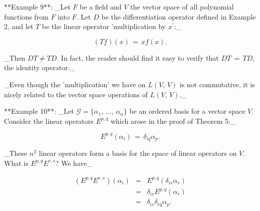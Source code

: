 

**Example 9**: _Let \(F\) be a field and \(V\) the vector space of all polynomial functions from \(F\) into \(F\). Let \(D\) be the differentiation operator defined in Example 2, and let \(T\) be the linear operator 'multiplication by \(x^{\prime}\):_

\[(Tf)(x)\,=\,xf(x).\]

_Then \(DT\neq TD\). In fact, the reader should find it easy to verify that \(DT\,=\,TD\), the identity operator._

_Even though the 'multiplication' we have on \(L(V,\,V)\) is not commutative, it is nicely related to the vector space operations of \(L(V,\,V)\)._

**Example 10**: _Let \(\mathcal{G}=\{\alpha_{1},\,\ldots,\,\alpha_{n}\}\) be an ordered basis for a vector space \(V\). Consider the linear operators \(E^{p,q}\) which arose in the proof of Theorem 5:_

\[E^{p,q}(\alpha_{i})\,=\,\delta_{iq}\alpha_{p}.\]

_These \(n^{2}\) linear operators form a basis for the space of linear operators on \(V\). What is \(E^{p,q}E^{r,s}\)? We have_

\[\begin{array}{rcl}(E^{p,q}E^{r,s})(\alpha_{i})&=&E^{p,q}(\delta_{is}\alpha_ {r})\\ &=&\delta_{is}E^{p,q}(\alpha_{r})\\ &=&\delta_{is}\delta_{rq}\alpha_{p}.\end{array}\]